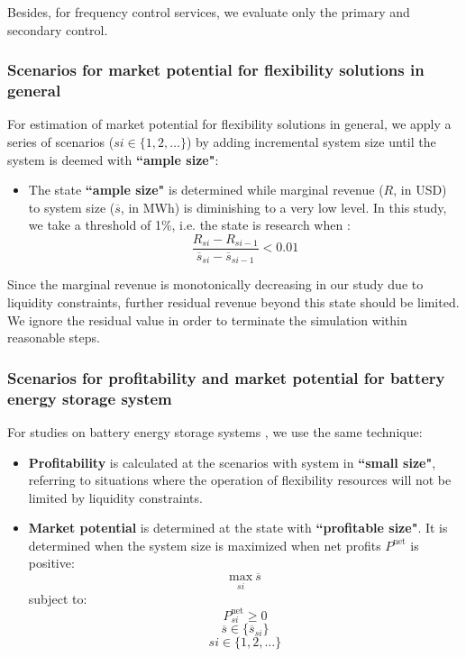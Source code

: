 Besides, for frequency control services, we evaluate only the primary and secondary control.

\subsubsection{Scenarios for market potential for flexibility solutions in general}

For estimation of market potential for flexibility solutions in general, we apply a series of scenarios ($si \in \{1,2,\dots\}$) by adding incremental system size until the system is deemed with \textbf{``ample size"}:
\begin{itemize}
	\item The state \textbf{``ample size"} is determined while marginal revenue ($R$, in USD) to system size ($\overline{s}$, in MWh) is diminishing to a very low level. In this study, we take a threshold of 1\%, i.e. the state is research when :
	\begin{equation*}
	\frac{R_{si}-R_{si-1}}{\overline{s}_{si}-\overline{s}_{si-1}} < 0.01
	\end{equation*}
\end{itemize}
Since the marginal revenue is monotonically decreasing in our study due to liquidity constraints, further residual revenue beyond this state should be limited. We ignore the residual value in order to terminate the simulation within reasonable steps.

\subsubsection{Scenarios for profitability and market potential for battery energy storage system}
For studies on battery energy storage systems , we use the same technique:

\begin{itemize}
	\item \textbf{Profitability} is calculated at the scenarios with system in \textbf{``small size"}, referring to situations where the operation of flexibility resources will not be limited by liquidity constraints.
	\item \textbf{Market potential} is determined at the state with \textbf{``profitable size"}. It is determined when the system size is maximized when net profits $P^{\text{net}}$ is positive:
	\begin{equation*}
	\underset{si}{\text{max}}~\overline{s}
	\end{equation*}
	subject to:
	\begin{equation*}
		P^{\text{net}}_{si} \geq 0
	\end{equation*}
	\begin{equation*}
		\overline{s} \in  \{ \overline{s}_{si}\}
	\end{equation*}
	\begin{equation*}
	si \in \{1,2,\dots\}
	\end{equation*}
\end{itemize}

